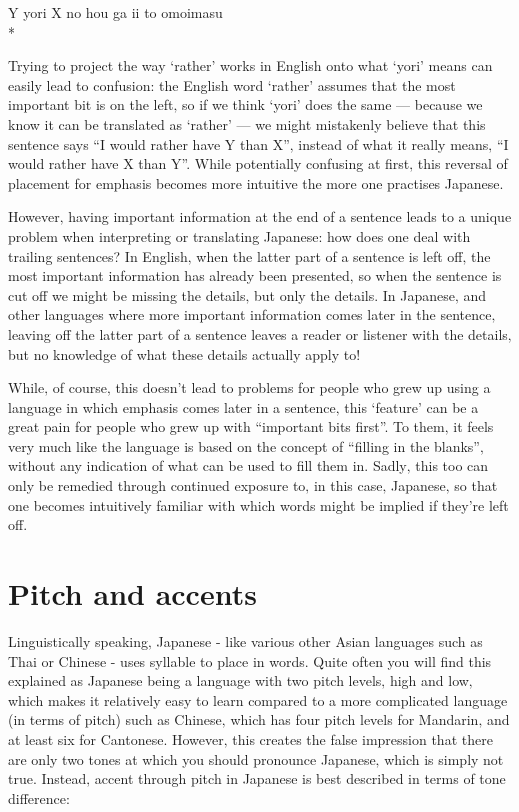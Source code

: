 \documentclass[11pt, b5paper, twoside, openright, onecolumn]{book}
\newenvironment{exampleblock}{
\setlength{\parindent}{0.6in}
\begin{minipage}[t]{\dimexpr\textwidth-\parindent}}
{\end{minipage}}
\begin{document}
\vspace{0.4cm}
\begin{exampleblock}
Y yori X no hou ga ii to omoimasu \\* 
\end{exampleblock}
\vspace{0.2cm}

Trying to project the way ‘rather’ works in English onto what ‘yori’ means can easily lead to confusion: the English word ‘rather’ assumes that the most important bit is on the left‚ so if we think ‘yori’ does the same — because we know it can be translated as ‘rather’ — we might mistakenly believe that this sentence says “I would rather have Y than X”‚ instead of what it really means‚ “I would rather have X than Y”. While potentially confusing at first‚ this reversal of placement for emphasis becomes more intuitive the more one practises Japanese.

However‚ having important information at the end of a sentence leads to a unique problem when interpreting or translating Japanese: how does one deal with trailing sentences? In English‚ when the latter part of a sentence is left off‚ the most important information has already been presented‚ so when the sentence is cut off we might be missing the details‚ but only the details. In Japanese‚ and other languages where more important information comes later in the sentence‚ leaving off the latter part of a sentence leaves a reader or listener with the details‚ but no knowledge of what these details actually apply to!

While‚ of course‚ this doesn’t lead to problems for people who grew up using a language in which emphasis comes later in a sentence‚ this ‘feature’ can be a great pain for people who grew up with “important bits first”. To them‚ it feels very much like the language is based on the concept of “filling in the blanks”‚ without any indication of what can be used to fill them in. Sadly‚ this too can only be remedied through continued exposure to‚ in this case‚ Japanese‚ so that one becomes intuitively familiar with which words might be implied if they’re left off.

\section{Pitch and accents}

Linguistically speaking‚ Japanese - like various other Asian languages such as Thai or Chinese - uses syllable  to place  in words. Quite often you will find this explained as Japanese being a language with two pitch levels‚ high and low‚ which makes it relatively easy to learn compared to a more complicated language (in terms of pitch) such as Chinese‚ which has four pitch levels for Mandarin‚ and at least six for Cantonese. However‚ this creates the false impression that there are only two tones at which you should pronounce Japanese‚ which is simply not true. Instead‚ accent through pitch in Japanese is best described in terms of tone difference:
\end{document}
